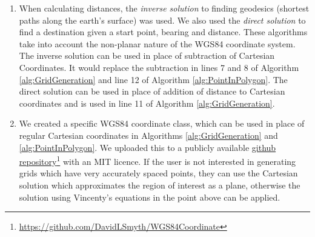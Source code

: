 \begin{enumerate}
    \item When calculating distances, the \textit{inverse solution} \cite{Vincenty1975DirectEquations} to finding geodesics (shortest paths along the earth's surface) was used. We also used the \textit{direct solution} \cite{Vincenty1975DirectEquations} to find a destination given a start point, bearing and distance. These algorithms take into account the non-planar nature of the WGS84 coordinate system. The inverse solution can be used in place of subtraction of Cartesian Coordinates. It would replace the subtraction in lines 7 and 8 of Algorithm \ref{alg:GridGeneration} and line 12 of Algorithm \ref{alg:PointInPolygon}. The direct solution can be used in place of addition of distance to Cartesian coordinates and is used in line 11 of Algorithm \ref{alg:GridGeneration}.
    
    \item We created a specific WGS84 coordinate class, which can be used in place of regular Cartesian coordinates in Algorithms \ref{alg:GridGeneration} and \ref{alg:PointInPolygon}. We uploaded this to a publicly available  \href{https://github.com/DavidLSmyth/WGS84Coordinate}{github repository}\footnote{\href {https://github.com/DavidLSmyth/WGS84Coordinate}{https://github.com/DavidLSmyth/WGS84Coordinate}} with an MIT licence. If the user is not interested in generating grids which have very accurately spaced points, they can use the Cartesian solution which approximates the region of interest as a plane, otherwise the solution using Vincenty's equations in the point above can be applied.
\end{enumerate}


